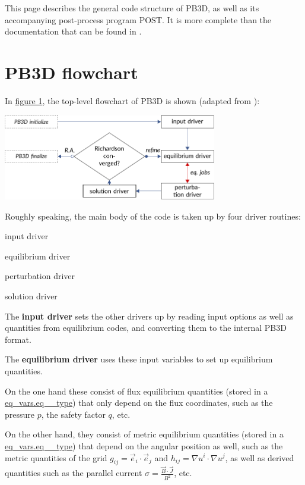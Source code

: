 This page describes the general code structure of P\+B3D, as well as its accompanying post-\/process program P\+O\+ST. It is more complete than the documentation that can be found in \cite{Weyens2017PB3D}.\hypertarget{page_overview_overview_PB3D_flowchart}{}\section{P\+B3\+D flowchart}\label{page_overview_overview_PB3D_flowchart}
In \hyperlink{page_overview_flowchart_fig}{figure 1}, the top-\/level flowchart of P\+B3D is shown (adapted from \cite{Weyens2017PB3D})\+:

\label{page_overview_flowchart_fig}%
%
 
\begin{DoxyImage}
\includegraphics[width=0.7\textwidth]{flowchart}
\end{DoxyImage}


Roughly speaking, the main body of the code is taken up by four driver routines\+:
\begin{DoxyItemize}
\item input driver
\item equilibrium driver
\item perturbation driver
\item solution driver
\end{DoxyItemize}

The {\bfseries input driver} sets the other drivers up by reading input options as well as quantities from equilibrium codes, and converting them to the internal P\+B3D format.

The {\bfseries equilibrium driver} uses these input variables to set up equilibrium quantities.
\begin{DoxyItemize}
\item On the one hand these consist of flux equilibrium quantities (stored in a \hyperlink{structeq__vars_1_1eq__1__type}{eq\+\_\+vars.\+eq\+\_\+\_\+type}) that only depend on the flux coordinates, such as the pressure $p$, the safety factor $q$, etc.
\item On the other hand, they consist of metric equilibrium quantities (stored in a \hyperlink{structeq__vars_1_1eq__2__type}{eq\+\_\+vars.\+eq\+\_\+\_\+type}) that depend on the angular position as well, such as the metric quantities of the grid $g_{ij} = \vec{e}_i \cdot \vec{e}_j$ and $h_{ij} = \nabla u^i \cdot \nabla u^j$, as well as derived quantities such as the parallel current $\sigma = \frac{\vec{B}\cdot\vec{J}}{B^2}$, etc. \cite{weyens2014theory}
\end{DoxyItemize}

